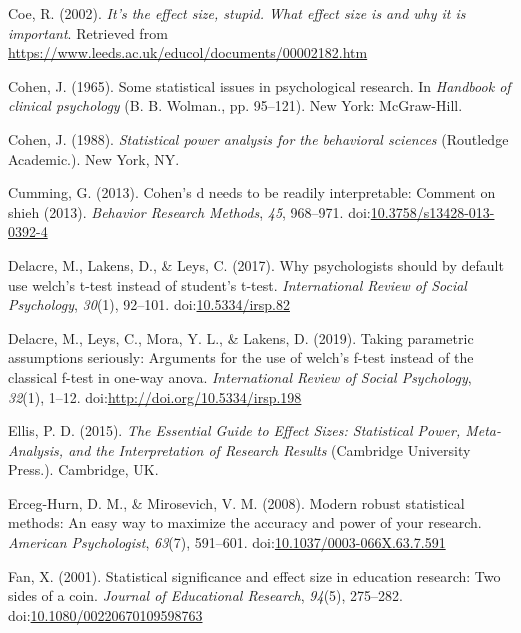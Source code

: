\documentclass[
  man,floatsintext]{apa6}
\begin{document}
\leavevmode\hypertarget{ref-Coe_2002}{}%
Coe, R. (2002). \emph{It's the effect size, stupid. What effect size is and why it is important}. Retrieved from \url{https://www.leeds.ac.uk/educol/documents/00002182.htm}

\leavevmode\hypertarget{ref-Cohen_1965}{}%
Cohen, J. (1965). Some statistical issues in psychological research. In \emph{Handbook of clinical psychology} (B. B. Wolman., pp. 95--121). New York: McGraw-Hill.

\leavevmode\hypertarget{ref-Cohen_1988}{}%
Cohen, J. (1988). \emph{Statistical power analysis for the behavioral sciences} (Routledge Academic.). New York, NY.

\leavevmode\hypertarget{ref-Cumming_2013}{}%
Cumming, G. (2013). Cohen's d needs to be readily interpretable: Comment on shieh (2013). \emph{Behavior Research Methods}, \emph{45}, 968--971. doi:\href{https://doi.org/10.3758/s13428-013-0392-4}{10.3758/s13428-013-0392-4}

\leavevmode\hypertarget{ref-Delacre_et_al_2017}{}%
Delacre, M., Lakens, D., \& Leys, C. (2017). Why psychologists should by default use welch's t-test instead of student's t-test. \emph{International Review of Social Psychology}, \emph{30}(1), 92--101. doi:\href{https://doi.org/10.5334/irsp.82}{10.5334/irsp.82}

\leavevmode\hypertarget{ref-Delacre_et_al_2019}{}%
Delacre, M., Leys, C., Mora, Y. L., \& Lakens, D. (2019). Taking parametric assumptions seriously: Arguments for the use of welch's f-test instead of the classical f-test in one-way anova. \emph{International Review of Social Psychology}, \emph{32}(1), 1--12. doi:\href{https://doi.org/http://doi.org/10.5334/irsp.198}{http://doi.org/10.5334/irsp.198}

\leavevmode\hypertarget{ref-Ellis_2015}{}%
Ellis, P. D. (2015). \emph{The Essential Guide to Effect Sizes: Statistical Power, Meta-Analysis, and the Interpretation of Research Results} (Cambridge University Press.). Cambridge, UK.

\leavevmode\hypertarget{ref-Erceg-Hurn_Mirosevich_2008}{}%
Erceg-Hurn, D. M., \& Mirosevich, V. M. (2008). Modern robust statistical methods: An easy way to maximize the accuracy and power of your research. \emph{American Psychologist}, \emph{63}(7), 591--601. doi:\href{https://doi.org/10.1037/0003-066X.63.7.591}{10.1037/0003-066X.63.7.591}

\leavevmode\hypertarget{ref-Fan_2001}{}%
Fan, X. (2001). Statistical significance and effect size in education research: Two sides of a coin. \emph{Journal of Educational Research}, \emph{94}(5), 275--282. doi:\href{https://doi.org/10.1080/00220670109598763}{10.1080/00220670109598763}
\end{document}

